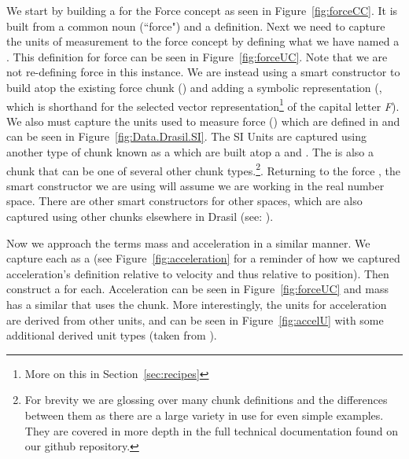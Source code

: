We start by building a  for the Force concept as seen in 
Figure~\ref{fig:forceCC}. It is built from a common noun (``force") and a 
definition. Next we need to capture the units of measurement to the force 
concept by defining what we have named a . This definition 
for force can be seen in Figure~\ref{fig:forceUC}. Note that we are not 
re-defining force in this instance. We are instead using a smart constructor to 
build atop the existing force chunk () and adding a symbolic 
representation (, which is shorthand for the selected vector 
representation\footnote{More on this in Section~\ref{sec:recipes}} of the 
capital letter \emph{F}). We also must capture the units used to measure force
() which are defined in  and can be 
seen in Figure~\ref{fig:Data.Drasil.SI}. The SI Units are captured using 
another type of chunk known as a  which are built atop a 
 and . The  is also a 
chunk that can be one of several other chunk types.\footnote{For brevity we are 
glossing over many chunk definitions and the differences between them as there 
are a large variety in use for even simple examples. They are covered in more 
depth in the full technical documentation found on our github repository.}. 
Returning to the force , the smart constructor  we 
are using will assume we are working in the real number space. There are 
other smart constructors for other spaces, which are also captured using other 
chunks elsewhere in Drasil (see: ).



Now we approach the terms mass and acceleration in a similar manner. We capture 
each as a  (see Figure~\ref{fig:acceleration} for a 
reminder of how we captured acceleration's definition relative to velocity and 
thus relative to position). Then construct a  for each. 
Acceleration can be seen in Figure~\ref{fig:forceUC} and mass has a similar 
 that uses the  chunk. More 
interestingly, the units for acceleration are derived from other units, and can 
be seen in Figure~\ref{fig:accelU} with some additional derived unit types 
(taken from ).

